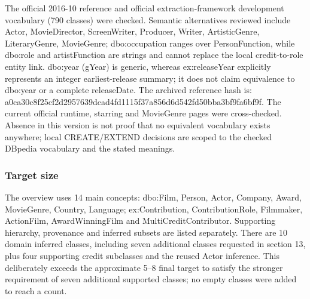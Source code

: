 \documentclass[
  11pt,
]{article}
\begin{document}
The official 2016-10 reference and official
extracti\allowbreak{}on-\allowbreak{}frame\allowbreak{}work development
vocabulary (790 classes) were checked. Semantic alternatives reviewed
include Actor, Movie\allowbreak{}Dir\allowbreak{}ector,
Screen\allowbreak{}Wr\allowbreak{}iter, Producer, Writer,
Artistic\allowbreak{}\allowbreak{}Genre,
Literary\allowbreak{}\allowbreak{}Genre, MovieGenre;
dbo:\allowbreak{}occu\allowbreak{}pation ranges over
Person\allowbreak{}Fu\allowbreak{}nction, while dbo:role and
artist\allowbreak{}Fu\allowbreak{}nction are strings and cannot replace
the local credit-\allowbreak{}t\allowbreak{}o-\allowbreak{}role entity
link. dbo:year (gYear) is generic, whereas
ex:\allowbreak{}relea\allowbreak{}se\allowbreak{}Year explicitly
represents an integer
earliest\allowbreak{}-\allowbreak{}release\allowbreak{} summary; it does
not claim equivalence to dbo:year or a complete releaseDate. The
archived reference hash is:
a0ca30c8\allowbreak{}f25cf2d2\allowbreak{}957639dc\allowbreak{}ad4fd111\allowbreak{}5f37a856\allowbreak{}d6d542fd\allowbreak{}50bba3bf\allowbreak{}9fa6bf9f\allowbreak{}.\allowbreak{}
The current official runtime, starring and MovieGenre pages were
cross-\allowbreak{}ch\allowbreak{}ecked.\allowbreak{} Absence in this
version is not proof that no equivalent vocabulary exists anywhere;
local
C\allowbreak{}R\allowbreak{}E\allowbreak{}A\allowbreak{}T\allowbreak{}E/\allowbreak{}\allowbreak{}E\allowbreak{}\allowbreak{}X\allowbreak{}T\allowbreak{}E\allowbreak{}N\allowbreak{}D
decisions are scoped to the checked DBpedia vocabulary and the stated
meanings.

\subsubsection{Target size}\label{target-size}

The overview uses 14 main concepts: dbo:Film, Person, Actor, Company,
Award, MovieGenre, Country, Language;
ex:\allowbreak{}\allowbreak{}Contr\allowbreak{}ibution,\allowbreak{}
Contribu\allowbreak{}tion\allowbreak{}Role\allowbreak{}, Filmmaker,
ActionFilm,
Award\allowbreak{}Win\allowbreak{}ning\allowbreak{}Film\allowbreak{} and
Multi\allowbreak{}Cre\allowbreak{}dit\allowbreak{}Contr\allowbreak{}ibutor.\allowbreak{}
Supporting hierarchy, provenance and inferred subsets are listed
separately. There are 10 domain inferred classes, including seven
additional classes requested in section 13, plus four supporting credit
subclasses and the reused Actor inference. This deliberately exceeds the
approximate 5--8 final target to satisfy the stronger requirement of
seven additional supported classes; no empty classes were added to reach
a count.
\end{document}
